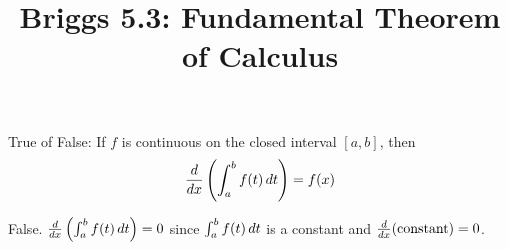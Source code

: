 \documentclass[nooutcomes,handout]{ximera}
\title{Briggs 5.3: Fundamental Theorem of Calculus}
\begin{document}
\begin{abstract}
\end{abstract}
\maketitle


\begin{problem}
  True of False: If $f$ is continuous on the closed interval $[a,b]$,
  then
  $$\frac{d}{dx} \left( \int_a^b f(t) \,d t \right) = f(x)$$
  \begin{freeResponse}
    False.  $\frac{d}{dx} \left( \int_a^b f(t) \,d t \right) = 0$
    since $\int_a^b f(t) \,d t$ is a constant and
    $\frac{d}{dx} (\text{constant}) = 0$.
  \end{freeResponse}
\end{problem}
\end{document}

